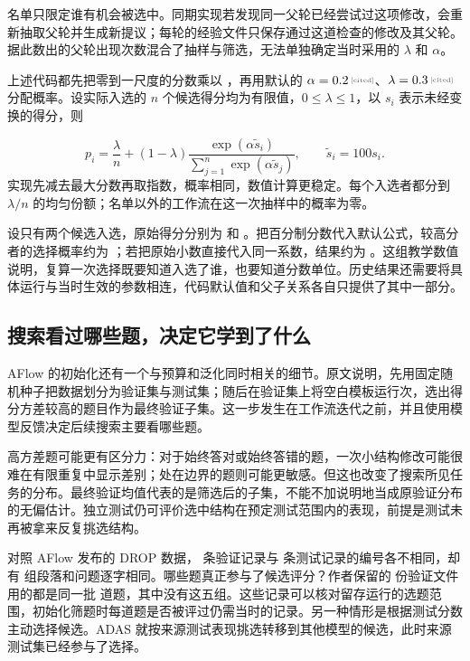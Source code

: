 名单只限定谁有机会被选中。同期实现若发现同一父轮已经尝试过这项修改，会重新抽取父轮并生成新提议；每轮的经验文件只保存通过这道检查的修改及其父轮\cite{aflow-metagpt-2024}。据此数出的父轮出现次数混合了抽样与筛选，无法单独确定当时采用的 $\lambda$ 和 $\alpha$。

上述代码都先把零到一尺度的分数乘以 ，再用默认的 $\alpha=\cited{0.2}$、$\lambda=\cited{0.3}$ 分配概率\cite{aflow-metagpt-2024,aflow-code-2025}。设实际入选的 $n$ 个候选得分均为有限值，$0\le\lambda\le1$，以 $s_i$ 表示未经变换的得分，则

\begin{equation}
 p_i=\frac{\lambda}{n}+(1-\lambda)
 \frac{\exp(\alpha\widetilde s_i)}
      {\sum_{j=1}^{n}\exp(\alpha\widetilde s_j)},
 \qquad \widetilde s_i=100s_i.
 \label{eq:ch09-reference-selection}
\end{equation}
实现先减去最大分数再取指数，概率相同，数值计算更稳定。每个入选者都分到 $\lambda/n$ 的均匀份额；名单以外的工作流在这一次抽样中的概率为零。

设只有两个候选入选，原始得分分别为  和 。把百分制分数代入默认公式，较高分者的选择概率约为 ；若把原始小数直接代入同一系数，结果约为 。这组教学数值说明，复算一次选择既要知道入选了谁，也要知道分数单位。历史结果还需要将具体运行与当时生效的参数相连，代码默认值和父子关系各自只提供了其中一部分。

\subsection{搜索看过哪些题，决定它学到了什么}
\label{sec:ch09-validationselection}

AFlow 的初始化还有一个与预算和泛化同时相关的细节。原文说明，先用固定随机种子把数据划分为验证集与测试集；随后在验证集上将空白模板运行次，选出得分方差较高的题目作为最终验证子集\cite{aflow-2410}。这一步发生在工作流迭代之前，并且使用模型反馈决定后续搜索主要看哪些题。

高方差题可能更有区分力：对于始终答对或始终答错的题，一次小结构修改可能很难在有限重复中显示差别；处在边界的题则可能更敏感。但这也改变了搜索所见任务的分布。最终验证均值代表的是筛选后的子集，不能不加说明地当成原验证分布的无偏估计。独立测试仍可评价选中结构在预定测试范围内的表现，前提是测试未再被拿来反复挑选结构。

对照 AFlow 发布的 DROP 数据， 条验证记录与  条测试记录的编号各不相同，却有  组段落和问题逐字相同。哪些题真正参与了候选评分？作者保留的  份验证文件用的都是同一批  道题，其中没有这五组\cite{aflow-code-2025}。这些记录可以核对留存运行的选题范围，初始化筛题时每道题是否被评过仍需当时的记录。另一种情形是根据测试分数主动选择候选。ADAS 就按来源测试表现挑选转移到其他模型的候选，此时来源测试集已经参与了选择\cite{adas-2408}。

